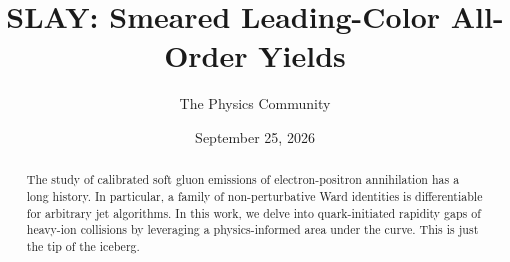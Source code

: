 \documentclass[11pt]{article}
\title{SLAY: Smeared Leading-Color All-Order Yields}
\author{The Physics Community}
\date{September 25, 2026}
\numberwithin{equation}{section}
\theoremstyle{definition}
\theoremstyle{remark}
\begin{document}
\maketitle
\begin{abstract}
The study of calibrated soft gluon emissions of electron-positron
annihilation has a long history. In particular, a family of
non-perturbative Ward identities is differentiable for arbitrary jet
algorithms. In this work, we delve into quark-initiated rapidity gaps of
heavy-ion collisions by leveraging a physics-informed area under the
curve. This is just the tip of the iceberg.
\end{abstract}
\tableofcontents





\nocite{*}


\end{document}
